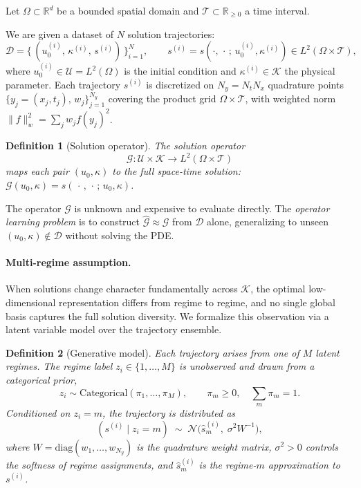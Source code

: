 \documentclass{article}
\newtheorem{definition}{Definition}
\newcommand{\R}{\mathbb{R}}
\newcommand{\cN}{\mathcal{N}}
\newcommand{\cK}{\mathcal{K}}
\newcommand{\cD}{\mathcal{D}}
\newcommand{\hats}{\hat{s}}
\newcommand{\T}{\mathcal{T}}
\newcommand{\cG}{\mathcal{G}}
\begin{document}
Let $\Omega \subset \R^d$ be a bounded spatial domain and $\T \subset \R_{\geq 0}$ a time interval.

We are given a dataset of $N$ solution trajectories:
\begin{equation}
  \cD = \bigl\{\,(u^{(i)}_0,\,\kappa^{(i)},\,s^{(i)})\,\bigr\}_{i=1}^{N},
  \qquad
  s^{(i)} = s\!\left(\cdot,\,\cdot\,;\,u^{(i)}_0,\kappa^{(i)}\right)
  \in L^2(\Omega\times\mathcal{T}),
  \label{eq:dataset}
\end{equation}
where $u_0^{(i)} \in \mathcal{U} = L^2(\Omega)$ is the initial condition and $\kappa^{(i)} \in \cK$ the physical parameter.
Each trajectory $s^{(i)}$ is discretized on $N_y = N_t N_x$ quadrature points
$\{y_j = (x_j, t_j),\, w_j\}_{j=1}^{N_y}$ covering the product grid
$\Omega \times \mathcal{T}$, with weighted norm $\|f\|_w^2 = \sum_j w_j f(y_j)^2$.

\begin{definition}[Solution operator]
\label{def:operator}
The \emph{solution operator}
 \[ \cG: \mathcal{U} \times \cK \to L^2(\Omega \times \T) \]
maps each pair $(u_0,\kappa)$ to the full space-time solution:
$\cG(u_0,\kappa) = s(\,\cdot\,,\,\cdot\,;\,u_0,\kappa)$.
\end{definition}


The operator $\cG$ is unknown and expensive to evaluate directly. The \emph{operator learning problem} is to construct $\hat{\cG} \approx \cG$ from $\cD$ alone, generalizing to unseen $(u_0,\kappa) \notin \cD$ without solving the PDE.


\paragraph{Multi-regime assumption.}

When solutions change character fundamentally across $\cK$, the optimal low-dimensional representation differs from regime to regime, and no single global basis captures the full solution diversity. We formalize this observation via a latent variable model over the trajectory ensemble.

\begin{definition}[Generative model]
\label{def:generative}
Each trajectory arises from one of $M$ latent regimes. The regime label $z_i \in \{1,\ldots,M\}$ is unobserved and drawn from a categorical prior,
\begin{equation}
  z_i \sim \mathrm{Categorical}(\pi_1,\ldots,\pi_M),
  \qquad \pi_m \geq 0,\quad \textstyle\sum_m \pi_m = 1.
  \label{eq:prior}
\end{equation}
Conditioned on $z_i = m$, the trajectory is distributed as
\begin{equation}
 ( s^{(i)} \mid z_i{=}m) \;\sim\;
  \cN\!\bigl(\hats_m^{(i)},\;\sigma^2 W^{-1}\bigr),
  \label{eq:likelihood}
\end{equation}
where $W = \mathrm{diag}(w_1,\ldots,w_{N_y})$ is the quadrature weight matrix, $\sigma^2 > 0$ controls the softness of regime assignments, and $\hats_m^{(i)}$ is the regime-$m$ approximation to $s^{(i)}$.
\end{definition}
\end{document}
